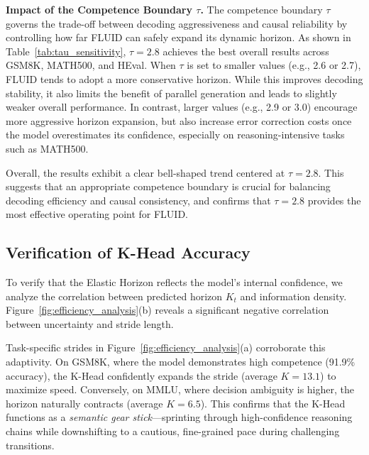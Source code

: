 \documentclass[11pt]{article}
\begin{document}
\textbf{Impact of the Competence Boundary $\tau$.}
The competence boundary $\tau$ governs the trade-off between decoding aggressiveness and causal reliability by controlling how far FLUID can safely expand its dynamic horizon. As shown in Table~\ref{tab:tau_sensitivity}, $\tau=2.8$ achieves the best overall results across GSM8K, MATH500, and HEval. When $\tau$ is set to smaller values (e.g., 2.6 or 2.7), FLUID tends to adopt a more conservative horizon. While this improves decoding stability, it also limits the benefit of parallel generation and leads to slightly weaker overall performance. In contrast, larger values (e.g., 2.9 or 3.0) encourage more aggressive horizon expansion, but also increase error correction costs once the model overestimates its confidence, especially on reasoning-intensive tasks such as MATH500.

Overall, the results exhibit a clear bell-shaped trend centered at $\tau=2.8$. This suggests that an appropriate competence boundary is crucial for balancing decoding efficiency and causal consistency, and confirms that $\tau=2.8$ provides the most effective operating point for FLUID.

\subsection{Verification of K-Head Accuracy}
To verify that the Elastic Horizon reflects the model's internal confidence, we analyze the correlation between predicted horizon $K_t$ and information density. Figure~\ref{fig:efficiency_analysis}(b) reveals a significant negative correlation between uncertainty and stride length.

Task-specific strides in Figure~\ref{fig:efficiency_analysis}(a) corroborate this adaptivity. On GSM8K, where the model demonstrates high competence (91.9\% accuracy), the K-Head confidently expands the stride (average $K=13.1$) to maximize speed. Conversely, on MMLU, where decision ambiguity is higher, the horizon naturally contracts (average $K = 6.5$). This confirms that the K-Head functions as a \textit{semantic gear stick}—sprinting through high-confidence reasoning chains while downshifting to a cautious, fine-grained pace during challenging transitions.

\end{document}
